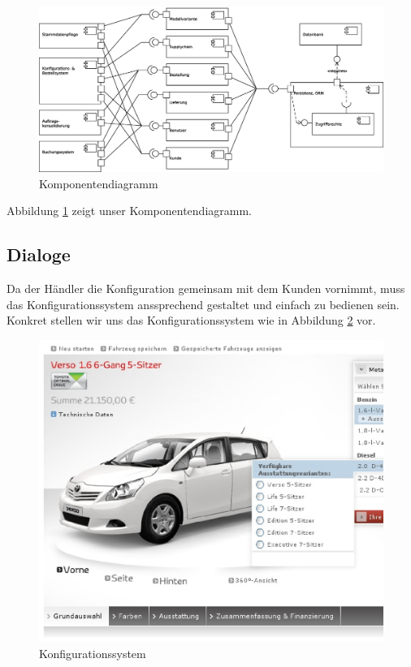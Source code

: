 \documentclass[a4paper,10pt]{article}
\begin{document}
\begin{figure}[htb]
 \begin{center}
   \includegraphics[width=1\textwidth]{komponentenDiagramm.eps}
    \caption{Komponentendiagramm}
    \label{komponentendiagramm}
  \end{center}
\end{figure}

Abbildung \ref{komponentendiagramm} zeigt unser Komponentendiagramm.


\subsection{Dialoge}

Da der Händler die Konfiguration gemeinsam mit dem Kunden vornimmt, muss das Konfigurationssystem anssprechend gestaltet und einfach zu bedienen sein.
Konkret stellen wir uns das Konfigurationssystem wie in Abbildung \ref{konfigurator} vor.

\begin{figure}[htb]
 \begin{center}
\hspace*{-7cm}
   \includegraphics[width=1\textwidth]{dialog_config.eps}
    \caption{Konfigurationssystem}
    \label{konfigurator}
  \end{center}
\end{figure}
\end{document}
